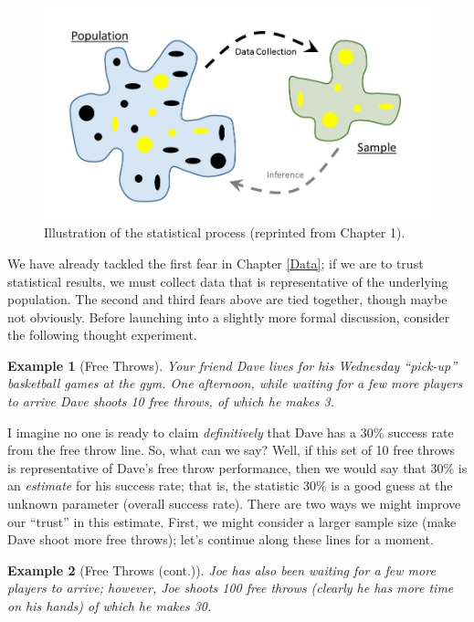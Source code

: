 \documentclass[
]{book}
\theoremstyle{plain}
\theoremstyle{mydefn}
\theoremstyle{myexmpl}
\newtheorem{example}{Example}[chapter]
\theoremstyle{remark}
\begin{document}
\begin{figure}

{\centering \includegraphics[width=0.8\linewidth]{images/Basics-Stat-Process} 

}

\caption{Illustration of the statistical process (reprinted from Chapter 1).}\label{fig:samplingdistns-statistical-process}
\end{figure}

We have already tackled the first fear in Chapter \ref{Data}; if we are to trust statistical results, we must collect data that is representative of the underlying population. The second and third fears above are tied together, though maybe not obviously. Before launching into a slightly more formal discussion, consider the following thought experiment.

\begin{example}[Free Throws]
\protect\hypertarget{exm:samplingdistns-free-throws}{}{\label{exm:samplingdistns-free-throws} {} }Your friend Dave lives for his Wednesday ``pick-up'' basketball games at the gym. One afternoon, while waiting for a few more players to arrive Dave shoots 10 free throws, of which he makes 3.
\end{example}

I imagine no one is ready to claim \emph{definitively} that Dave has a 30\% success rate from the free throw line. So, what can we say? Well, if this set of 10 free throws is representative of Dave's free throw performance, then we would say that 30\% is an \emph{estimate} for his success rate; that is, the statistic 30\% is a good guess at the unknown parameter (overall success rate). There are two ways we might improve our ``trust'' in this estimate. First, we might consider a larger sample size (make Dave shoot more free throws); let's continue along these lines for a moment.

\begin{example}[Free Throws (cont.)]
\protect\hypertarget{exm:samplingdistns-free-throws2}{}{\label{exm:samplingdistns-free-throws2} {} }Joe has also been waiting for a few more players to arrive; however, Joe shoots 100 free throws (clearly he has more time on his hands) of which he makes 30.
\end{example}
\end{document}
